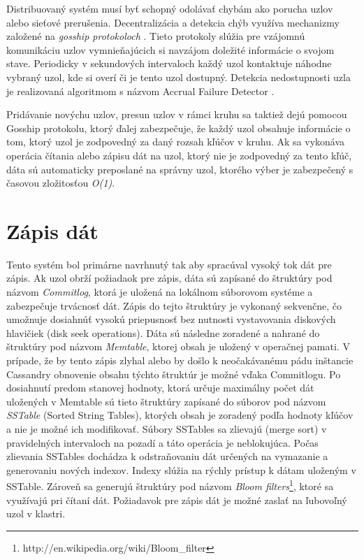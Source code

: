 \documentclass[11pt,twoside,a4paper]{book}
\begin{document}
Distribuovaný systém musí byť schopný odolávať chybám ako porucha uzlov alebo sieťové prerušenia. Decentralizácia a detekcia chýb využíva mechanizmy založené na \emph{gosship protokoloch} \cite{ganesh2003peer}. Tieto protokoly slúžia pre vzájomnú komunikáciu uzlov vymnieňajúcich si navzájom doležité informácie o svojom stave. Periodicky v sekundových intervaloch každý uzol kontaktuje náhodne vybraný uzol, kde si overí či je tento uzol dostupný. Detekcia nedostupnosti uzla je realizovaná algoritmom s názvom Accrual Failure Detector \cite{hayashibara2004}.

Pridávanie novýchu uzlov, presun uzlov v rámci kruhu sa taktiež dejú pomocou Gosship protokolu, ktorý ďalej zabezpečuje, že každý uzol obsahuje informácie o tom, ktorý uzol je zodpovedný za daný rozsah kľúčov v kruhu. Ak sa vykonáva operácia čítania alebo zápisu dát na uzol, ktorý nie je zodpovedný za tento kľúč, dáta sú automaticky preposlané na správny uzol, ktorého výber je zabezpečený s časovou zložitosťou \textit{O(1)}.


\section{Zápis dát}
Tento systém bol primárne navrhnutý tak aby spracúval vysoký tok dát pre zápis. Ak uzol obrží požiadaok pre zápis, dáta sú zapísané do štruktúry pod názvom \emph{Commitlog}, ktorá je uložená na lokálnom súborovom systéme a zabezpečuje trvácnosť dát. Zápis do tejto štruktúry je vykonaný sekvenčne, čo umožnuje dosiahnúť vysokú priepusnosť bez nutnosti vystavovania diskových hlavičiek (disk seek operations). Dáta sú následne zoradené a nahrané do štruktúry pod názvom \emph{Memtable}, ktorej obsah je uložený v operačnej pamati. V prípade, že by tento zápis zlyhal alebo by došlo k neočakávanému pádu inštancie Cassandry obnovenie obsahu týchto štruktúr je možné vďaka Commitlogu. Po dosiahnutí predom stanovej hodnoty, ktorá určuje maximálny počet dát uložených v Memtable sú tieto štruktúry zapísané do súborov pod názvom \emph{SSTable} (Sorted String Tables), ktorých obsah je zoradený podľa hodnoty kľúčov a nie je možné ich modifikovať. Súbory SSTables sa zlievajú (merge sort) v pravidelných intervaloch na pozadí a táto operácia je neblokujúca. Počas zlievania SSTables dochádza k odstraňovaniu dát určených na vymazanie a generovaniu nových indexov. Indexy slúžia na rýchly prístup k dátam uloženým v SSTable. Zároveň sa generujú štruktúry pod názvom \emph{Bloom filters}\footnote{http://en.wikipedia.org/wiki/Bloom\_filter}, ktoré sa využívajú pri čítaní dát. Požiadavok pre zápis dát je možné zaslať na ľubovoľný uzol v klastri.
\end{document}
